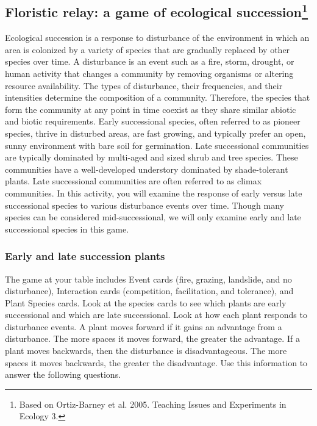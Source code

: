 \documentclass[12pt, hidelinks]{exam}
\begin{document}
\subsection*{Floristic relay: a game of ecological succession\footnote{Based on Ortiz-Barney et al. 2005. Teaching Issues and Experiments in Ecology 3.}}

Ecological succession is a response to disturbance of the environment in which an area is colonized by a variety of species that are gradually replaced by other species over time. A disturbance is an event such as a fire, storm, drought, or human activity that changes a community by removing organisms or altering resource availability. The types of disturbance, their frequencies, and their intensities determine the composition of a community.  Therefore, the species that form the community at any point in time coexist as they share similar abiotic and biotic requirements.  Early successional species, often referred to as pioneer species, thrive in disturbed areas, are fast growing, and typically prefer an open, sunny environment with bare soil for germination. Late successional communities are typically dominated by multi-aged and sized shrub and tree species.  These communities have a well-developed understory  dominated by shade-tolerant plants.  Late successional communities are often referred to as climax communities. In this activity, you will examine the response of early versus late successional species to various disturbance events over time.  Though many species can be considered mid-successional, we will only examine early and late successional species in this game.

\subsubsection*{Early and late succession plants}

The game at your table includes Event cards (fire, grazing, landslide, and no disturbance), Interaction cards (competition, facilitation, and tolerance), and Plant Species cards. Look at the species cards to see which plants are early successional and which are late successional. Look 
at how each plant responds to disturbance events. A plant moves forward if it gains an advantage from a disturbance. The more spaces it moves forward, the greater the advantage. If a plant moves backwards, then the disturbance is disadvantageous. The more spaces it moves backwards, the greater the disadvantage. Use this information to answer the following questions.
\end{document}
